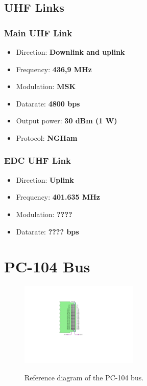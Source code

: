 \subsection{UHF Links}

\subsubsection{Main UHF Link}

\begin{itemize}
    \item Direction: \textbf{Downlink and uplink}
    \item Frequency: \textbf{436,9 MHz}
    \item Modulation: \textbf{MSK}
    \item Datarate: \textbf{4800 bps}
    \item Output power: \textbf{30 dBm (1 W)}
    \item Protocol: \textbf{NGHam}
\end{itemize}

\subsubsection{EDC UHF Link}

\begin{itemize}
    \item Direction: \textbf{Uplink}
    \item Frequency: \textbf{401.635 MHz}
    \item Modulation: \textbf{????}
    \item Datarate: \textbf{???? bps}
\end{itemize}

\section{PC-104 Bus}

\begin{figure}[!ht]
    \begin{center}
        \includegraphics[width=0.5\textwidth]{figures/pc104-diagram}
        \label{fig:pc104-diagram}
        \caption{Reference diagram of the PC-104 bus.}
    \end{center}
\end{figure}


